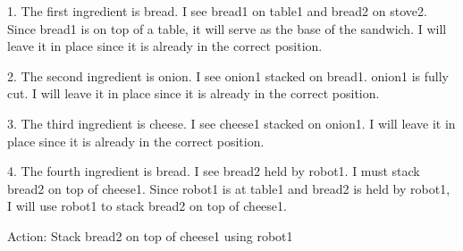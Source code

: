 1. The first ingredient is bread. I see bread1 on table1 and bread2 on stove2. Since bread1 is on top of a table, it will serve as the base of the sandwich. I will leave it in place since it is already in the correct position.

2. The second ingredient is onion. I see onion1 stacked on bread1. onion1 is fully cut. I will leave it in place since it is already in the correct position.

3. The third ingredient is cheese. I see cheese1 stacked on onion1. I will leave it in place since it is already in the correct position.

4. The fourth ingredient is bread. I see bread2 held by robot1. I must stack bread2 on top of cheese1. Since robot1 is at table1 and bread2 is held by robot1, I will use robot1 to stack bread2 on top of cheese1.

Action: Stack bread2 on top of cheese1 using robot1
